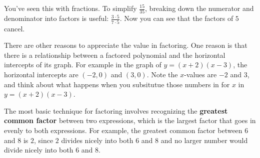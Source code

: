 \documentclass{ximera}
\begin{document}
  You've seen this with fractions.
      To simplify $\frac{15}{35}$,
      breaking down the numerator and denominator into factors is useful:
      $\frac{3\cdot5}{7\cdot5}$.
      Now you can see that the factors of $5$ cancel.

     There are other reasons to appreciate the value in factoring.
        One reason is that there is a relationship between a factored polynomial
        and the horizontal intercepts of its graph.
        For example in the graph of $y=(x+2)(x-3)$, the horizontal intercepts are $(-2,0)$ and $(3,0)$.
        Note the $x$-values are $-2$ and $3$,
        and think about what happens when you subsitutue those numbers in for $x$ in $y=(x+2)(x-3)$.
\begin{image}
\end{image}

 The most basic technique for factoring involves recognizing the
      \textbf{greatest common factor}
            between two expressions,
      which is the largest factor that goes in evenly to both expressions.
      For example,
      the greatest common factor between $6$ and $8$ is $2$, since $2$ divides nicely into both $6$ and $8$ and no larger number would divide nicely into both $6$ and $8$.
\end{document}
